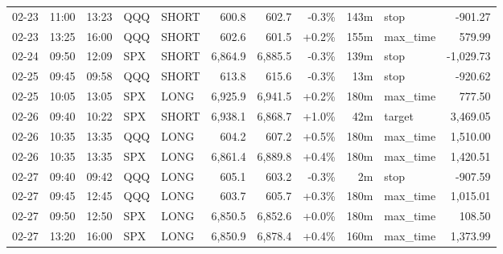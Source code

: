 \documentclass[11pt,a4paper,twoside]{article}
\begin{document}
\begin{center}
\begin{longtable}{>{\color{txtmain}}l l l l l r r r r >{\color{txtmain}}l r}
02-23 & 11:00 & 13:23 & QQQ & SHORT & 600.8 & 602.7 & \textcolor{lossred}{-0.3\%} & 143m & stop & \textcolor{lossred}{-901.27} \\
02-23 & 13:25 & 16:00 & QQQ & SHORT & 602.6 & 601.5 & \textcolor{wingreen}{+0.2\%} & 155m & max\_time & \textcolor{wingreen}{579.99} \\
02-24 & 09:50 & 12:09 & SPX & SHORT & 6,864.9 & 6,885.5 & \textcolor{lossred}{-0.3\%} & 139m & stop & \textcolor{lossred}{-1,029.73} \\
02-25 & 09:45 & 09:58 & QQQ & SHORT & 613.8 & 615.6 & \textcolor{lossred}{-0.3\%} & 13m & stop & \textcolor{lossred}{-920.62} \\
02-25 & 10:05 & 13:05 & SPX & LONG & 6,925.9 & 6,941.5 & \textcolor{wingreen}{+0.2\%} & 180m & max\_time & \textcolor{wingreen}{777.50} \\
02-26 & 09:40 & 10:22 & SPX & SHORT & 6,938.1 & 6,868.7 & \textcolor{wingreen}{+1.0\%} & 42m & target & \textcolor{wingreen}{3,469.05} \\
02-26 & 10:35 & 13:35 & QQQ & LONG & 604.2 & 607.2 & \textcolor{wingreen}{+0.5\%} & 180m & max\_time & \textcolor{wingreen}{1,510.00} \\
02-26 & 10:35 & 13:35 & SPX & LONG & 6,861.4 & 6,889.8 & \textcolor{wingreen}{+0.4\%} & 180m & max\_time & \textcolor{wingreen}{1,420.51} \\
02-27 & 09:40 & 09:42 & QQQ & LONG & 605.1 & 603.2 & \textcolor{lossred}{-0.3\%} & 2m & stop & \textcolor{lossred}{-907.59} \\
02-27 & 09:45 & 12:45 & QQQ & LONG & 603.7 & 605.7 & \textcolor{wingreen}{+0.3\%} & 180m & max\_time & \textcolor{wingreen}{1,015.01} \\
02-27 & 09:50 & 12:50 & SPX & LONG & 6,850.5 & 6,852.6 & \textcolor{wingreen}{+0.0\%} & 180m & max\_time & \textcolor{wingreen}{108.50} \\
02-27 & 13:20 & 16:00 & SPX & LONG & 6,850.9 & 6,878.4 & \textcolor{wingreen}{+0.4\%} & 160m & max\_time & \textcolor{wingreen}{1,373.99} \\
\end{longtable}
\end{center}
\clearpage
\end{document}
